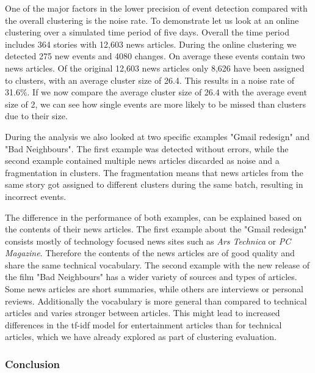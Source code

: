 One of the major factors in the lower precision of event detection compared with the overall clustering is the noise rate. To demonstrate let us look at an online clustering over a simulated time period of five days. Overall the time period includes 364 stories with 12,603 news articles. During the online clustering we detected 275 new events and 4080 changes. On average these events contain two news articles. Of the original 12,603 news articles only 8,626 have been assigned to clusters, with an average cluster size of 26.4. This results in a noise rate of 31.6\%. If we now compare the average cluster size of 26.4 with the average event size of 2, we can see how single events are more likely to be missed than clusters due to their size.  

During the analysis we also looked at two specific examples "Gmail redesign" and "Bad Neighbours". The first example was detected without errors, while the second example contained multiple news articles discarded as noise and a fragmentation in clusters. The fragmentation means that news articles from the same story got assigned to different clusters during the same batch, resulting in incorrect events.

The difference in the performance of both examples, can be explained based on the contents of their news articles. The first example about the "Gmail redesign" consists mostly of technology focused news sites such as \textit{Ars Technica} or \textit{PC Magazine}. Therefore the contents of the news articles are of good quality and share the same technical vocabulary. The second example with the new release of the film "Bad Neighbours" has a wider variety of sources and types of articles. Some news articles are short summaries, while others are interviews or personal reviews. Additionally the vocabulary is more general than compared to technical articles and varies stronger between articles. This might lead to increased differences in the tf-idf model for entertainment articles than for technical articles, which we have already explored as part of clustering evaluation.

\subsubsection{Conclusion}

